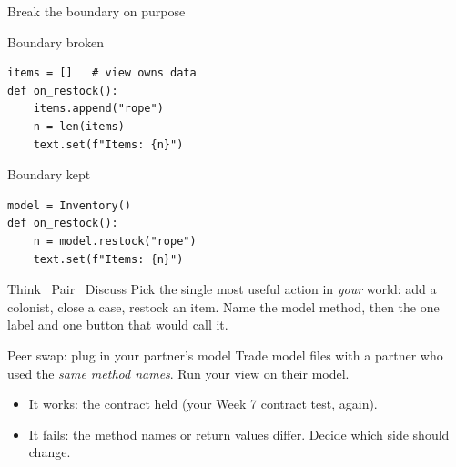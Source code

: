 \documentclass[aspectratio=169]{beamer}
\begin{document}
\begin{frame}[fragile]{Break the boundary on purpose}
\begin{comparebody}
  \begin{compareleft}{Boundary broken}
\begin{lstlisting}
items = []   # view owns data
def on_restock():
    items.append("rope")
    n = len(items)
    text.set(f"Items: {n}")
\end{lstlisting}
  \end{compareleft}
  \begin{compareright}{Boundary kept}
\begin{lstlisting}
model = Inventory()
def on_restock():
    n = model.restock("rope")
    text.set(f"Items: {n}")
\end{lstlisting}
  \end{compareright}
\end{comparebody}
\end{frame}

\begin{pairdiscussframe}{Think \textbullet\ Pair \textbullet\ Discuss}
  Pick the single most useful action in \emph{your} world: add a colonist, close a case, restock an item. Name the model method, then the one label and one button that would call it.
\end{pairdiscussframe}

\begin{designdecisionframe}{Peer swap: plug in your partner's model}
  Trade model files with a partner who used the \emph{same method names}. Run your view on their model.
  \begin{itemize}
    \item It works: the contract held (your Week 7 contract test, again).
    \item It fails: the method names or return values differ. Decide which side should change.
  \end{itemize}
\end{designdecisionframe}
\end{document}
